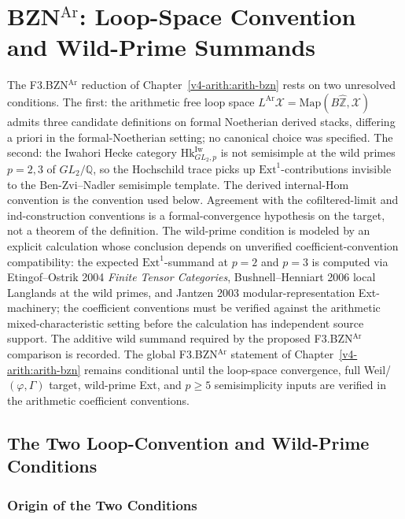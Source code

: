 \chapter{BZN\({}^{\mathrm{Ar}}\): Loop-Space Convention and Wild-Prime Summands}
\label{v4-arith:bzn-rcompletion}

The F3.BZN\({}^{\mathrm{Ar}}\) reduction of
Chapter~\ref{v4-arith:arith-bzn} rests on two unresolved conditions.
The first: the arithmetic free loop space
\(L^{\mathrm{Ar}}\mathcal{X}=\mathrm{Map}(B\widehat{\mathbb{Z}},\mathcal{X})\)
admits three candidate definitions on formal Noetherian derived
stacks, differing a priori in the formal-Noetherian setting; no
canonical choice was specified. The second: the Iwahori Hecke
category \(\mathrm{Hk}^{\mathrm{Iw}}_{GL_{2},p}\) is not semisimple at
the wild primes \(p=2,3\) of \(GL_{2}/\mathbb{Q}\), so the Hochschild
trace picks up \(\mathrm{Ext}^{1}\)-contributions invisible to the
Ben-Zvi--Nadler semisimple template.
The derived internal-Hom convention is the convention used below.
Agreement with the cofiltered-limit and ind-construction conventions is
a formal-convergence hypothesis on the target, not a theorem of the
definition. The wild-prime condition is modeled by an explicit
calculation whose conclusion depends on unverified
coefficient-convention compatibility: the expected
\(\mathrm{Ext}^{1}\)-summand at \(p=2\) and \(p=3\) is computed via
Etingof--Ostrik 2004 \emph{Finite Tensor Categories},
Bushnell--Henniart 2006 local Langlands at the wild primes, and
Jantzen 2003 modular-representation Ext-machinery; the coefficient
conventions must be verified against the arithmetic mixed-characteristic
setting before the calculation has independent source support.
The additive wild summand required by the proposed
F3.BZN\({}^{\mathrm{Ar}}\) comparison is recorded. The global
F3.BZN\({}^{\mathrm{Ar}}\) statement of Chapter~\ref{v4-arith:arith-bzn}
remains conditional until the loop-space convergence, full
Weil/\((\varphi,\Gamma)\) target, wild-prime Ext, and \(p\geq 5\)
semisimplicity inputs are verified in the arithmetic coefficient
conventions.

\section{The Two Loop-Convention and Wild-Prime Conditions}
\label{v4-arith:bzn-rcompletion:context}

\subsection{Origin of the Two Conditions}

